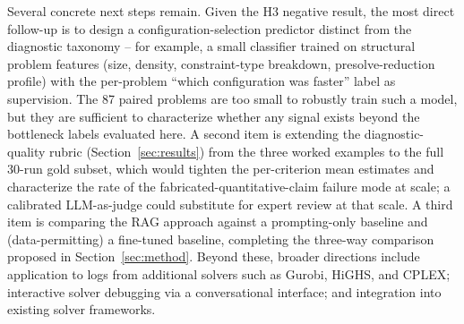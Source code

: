 \documentclass[11pt]{article}
\begin{document}
Several concrete next steps remain. Given the H3 negative result, the most direct follow-up is to design a configuration-selection predictor distinct from the diagnostic taxonomy -- for example, a small classifier trained on structural problem features (size, density, constraint-type breakdown, presolve-reduction profile) with the per-problem ``which configuration was faster'' label as supervision. The 87 paired problems are too small to robustly train such a model, but they are sufficient to characterize whether any signal exists beyond the bottleneck labels evaluated here.
A second item is extending the diagnostic-quality rubric (Section~\ref{sec:results}) from the three worked examples to the full 30-run gold subset, which would tighten the per-criterion mean estimates and characterize the rate of the fabricated-quantitative-claim failure mode at scale; a calibrated LLM-as-judge could substitute for expert review at that scale.
A third item is comparing the RAG approach against a prompting-only baseline and (data-permitting) a fine-tuned baseline, completing the three-way comparison proposed in Section~\ref{sec:method}.
Beyond these, broader directions include application to logs from additional solvers such as Gurobi, HiGHS, and CPLEX; interactive solver debugging via a conversational interface; and integration into existing solver frameworks.
\end{document}
